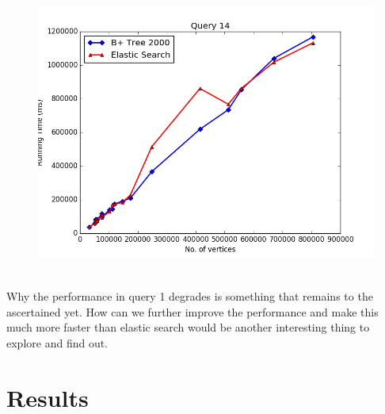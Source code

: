 \begin{figure}[H]
\begin{minipage}{.33\textwidth}
  \includegraphics[width=1\linewidth]{Figures/figure_14-1}
  \label{fig:test2}
\end{minipage}
\end{figure}
$\:$\\
Why the performance in query 1 degrades is something that remains to the ascertained yet. How can we further improve the performance and make this much more faster than elastic search would be another interesting thing to explore and find out.





\section{Results}

